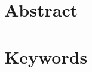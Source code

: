 \documentclass[twocolumn]{paper}
\title{}
\begin{document}
\maketitle
\section*{Abstract}
    
\section*{Keywords}
    



\end{document}
